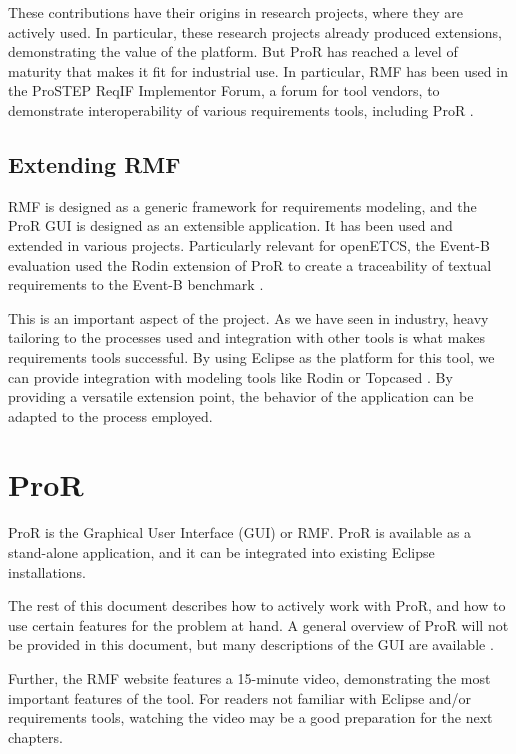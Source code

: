 \documentclass{template/openetcs_report}
\begin{document}
These contributions have their origins in research projects, where they are actively used. In particular, these research projects already produced extensions, demonstrating the value of the platform.  But ProR has reached a level of maturity that makes it fit for industrial use.  In particular, RMF has been used in the ProSTEP ReqIF Implementor Forum, a forum for tool vendors, to demonstrate interoperability of various requirements tools, including ProR \cite{prostep_if}.

\subsection{Extending RMF}

RMF is designed as a generic framework for requirements modeling, and the ProR GUI is designed as an extensible application.  It has been used and extended in various projects. Particularly relevant for openETCS, the Event-B evaluation used the Rodin extension of ProR to create a traceability of textual requirements to the Event-B benchmark \cite{event_b_benchmark}.

This is an important aspect of the project.  As we have seen in industry, heavy tailoring to the processes used and integration with other tools is what makes requirements tools successful.  By using Eclipse as the platform for this tool, we can provide integration with modeling tools like Rodin \cite{jastram_forms_2012} or Topcased \cite{topcase-JaGr2011}.  By providing a versatile extension point, the behavior of the application can be adapted to the process employed.

\section{ProR}
\label{pror}

ProR is the Graphical User Interface (GUI) or RMF.  ProR is available as a stand-alone application, and it can be integrated into existing Eclipse installations.  

The rest of this document describes how to actively work with ProR, and how to use certain features for the problem at hand.  A general overview of ProR will not be provided in this document, but many descriptions of the GUI are available \cite{RMF_Mark_Book_Jastram_2013, reqif_ObjektSpektrum_2013}.  

Further, the RMF website \cite{RMF} features a 15-minute video, demonstrating the most important features of the tool.  For readers not familiar with Eclipse and/or requirements tools, watching the video may be a good preparation for the next chapters.
\end{document}
